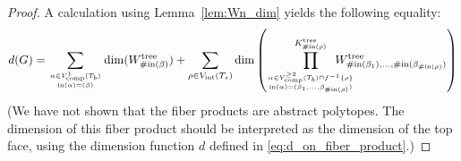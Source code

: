 \documentclass[11pt]{amsart}
\theoremstyle{definition}
\theoremstyle{remark}
\theoremstyle{plain}
\newcommand{\on}{\operatorname}
\newcommand{\comp}{C^2}
\renewcommand{\comp}{{\on{comp}}}
\newcommand{\incom}{\on{in}}
\newcommand{\inte}{{\on{int}}}
\newcommand{\tree}{{\on{tree}}}
\newcommand{\wt}{\widetilde}
\begin{document}
\begin{proof}
%
%
A calculation using Lemma~\ref{lem:Wn_dim} yields the following equality:
\begin{align}
\label{eq:fiber_decomp_of_d}
d(G)
=
\sum_{{\alpha \in V_\comp^1(T_b)}
\atop
{\incom(\alpha) = (\beta)}} \dim(W_{\#\!\incom(\beta)}^\tree)
+
\sum_{\rho \in V_\inte(T_s)}
\dim\left(\prod^{K^\tree_{\#\!\incom(\rho)}}_{
{\alpha\in V_\comp^{\geq2}(T_b)\cap f^{-1}\{\rho\}}
\atop
{\incom(\alpha)=(\beta_1,\ldots,\beta_{\#\!\incom(\rho)})}
}
\hspace{-0.25in} W^\tree_{\#\!\incom(\beta_1),\ldots,\#\!\incom(\beta_{\#\!\incom(\rho)})}\right)
\end{align}
(We have not shown that the fiber products are abstract polytopes.
The dimension of this fiber product should be interpreted as the dimension of the top face, using the dimension function $d$ defined in \eqref{eq:d_on_fiber_product}.)

\end{proof}
\end{document}
